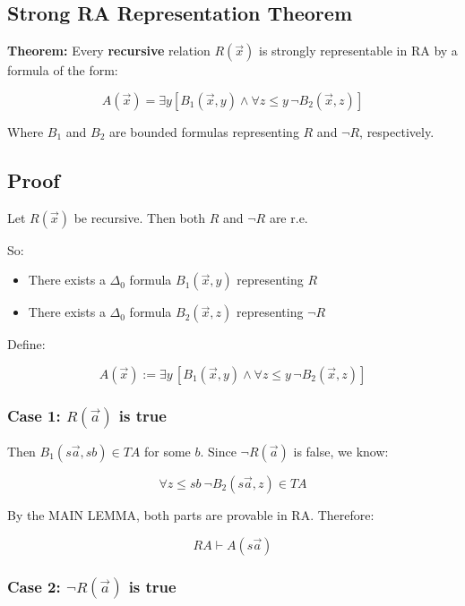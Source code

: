 \documentclass[12pt]{article}
\begin{document}
\subsection{Strong RA Representation Theorem}

\textbf{Theorem:} Every \textbf{recursive} relation \( R(\vec{x}) \) is strongly representable in RA by a formula of the form:

\[
A(\vec{x}) = \exists y \left[ B_1(\vec{x}, y) \wedge \forall z \leq y\, \neg B_2(\vec{x}, z) \right]
\]

Where \( B_1 \) and \( B_2 \) are bounded formulas representing \( R \) and \( \neg R \), respectively.

\subsection{Proof}

Let \( R(\vec{x}) \) be recursive. Then both \( R \) and \( \neg R \) are r.e.

So:

\begin{itemize}
  \item There exists a \( \Delta_0 \) formula \( B_1(\vec{x}, y) \) representing \( R \)
  \item There exists a \( \Delta_0 \) formula \( B_2(\vec{x}, z) \) representing \( \neg R \)
\end{itemize}

Define:

\[
A(\vec{x}) := \exists y\, [ B_1(\vec{x}, y) \wedge \forall z \leq y\, \neg B_2(\vec{x}, z) ]
\]

\subsubsection*{Case 1: \( R(\vec{a}) \) is true}

Then \( B_1(s\vec{a}, sb) \in TA \) for some \( b \). Since \( \neg R(\vec{a}) \) is false, we know:

\[
\forall z \leq sb\ \neg B_2(s\vec{a}, z) \in TA
\]

By the MAIN LEMMA, both parts are provable in RA. Therefore:

\[
RA \vdash A(s\vec{a})
\]

\subsubsection*{Case 2: \( \neg R(\vec{a}) \) is true}
\end{document}
